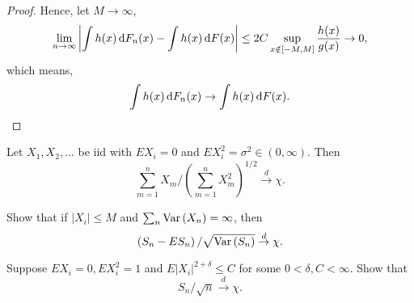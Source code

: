 \begin{proof}
	Hence, let \(M\rightarrow\infty\),
	\begin{equation*}
		\lim_{n\rightarrow\infty}\left|\int h(x)\mathop{}\!\mathrm{d} F_{n}(x)-\int h(x)\mathop{}\!\mathrm{d} F(x)\right| \leq 2C\sup_{x\notin[-M,M]}\frac{h(x)}{g(x)}\rightarrow 0,
	\end{equation*}
	which means,
	\begin{equation*}
		\int h(x)\mathop{}\!\mathrm{d} F_{n}(x) \rightarrow \int h(x)\mathop{}\!\mathrm{d} F(x).
	\end{equation*}
\end{proof}

\begin{exercise}
	Let \(X_{1},X_{2},\ldots\) be iid with \(EX_{i}=0\) and \(EX_{i}^{2}=\sigma^{2}\in(0,\infty)\). Then
	\begin{equation*}
		\sum_{m=1}^{n}X_{m}/\left(\sum_{m=1}^{n}X_{m}^{2}\right)^{1/2}\stackrel{d}{\rightarrow}\chi.
	\end{equation*}
\end{exercise}

\begin{exercise}
	Show that if \(\left|X_{i}\right|\leq M\) and \(\sum_{n}\mathrm{Var}\left(X_{n}\right)=\infty\), then
	\begin{equation*}
		\left(S_{n}-E S_{n}\right)/\sqrt{\mathrm{Var}\left(S_{n}\right)}\stackrel{d}{\rightarrow}\chi.
	\end{equation*}
\end{exercise}

\begin{exercise}
	Suppose \(EX_{i}=0,EX_{i}^{2}=1\) and \(E\left|X_{i}\right|^{2+\delta}\leq C\) for some \(0<\delta,C<\infty\). Show that
	\begin{equation*}
		S_{n}/\sqrt{n}\stackrel{d}{\rightarrow}\chi.
	\end{equation*}
\end{exercise}
